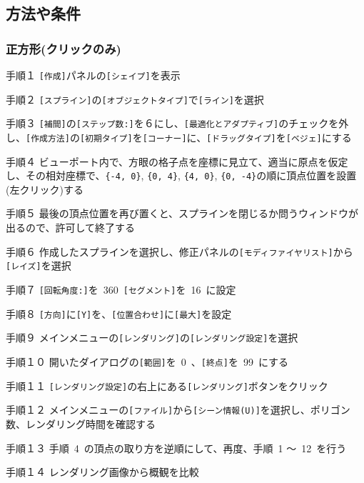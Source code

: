\documentclass[a4j]{jarticle}
\begin{document}
\subsection{方法や条件}
%
\subsubsection{正方形(クリックのみ)}
\begin{description}
\item{手順１} \verb|[作成]|パネルの\verb|[シェイプ]|を表示
\item{手順２} \verb|[スプライン]|の\verb|[オブジェクトタイプ]|で\verb|[ライン]|を選択
\item{手順３} \verb|[補間]|の\verb|[ステップ数:]|を６にし、\verb|[最適化とアダプティブ]|のチェックを外し、\verb|[作成方法]|の\verb|[初期タイプ]|を\verb|[コーナー]|に、\verb|[ドラッグタイプ]|を\verb|[ベジェ]|にする
\item{手順４} ビューポート内で、方眼の格子点を座標に見立て、適当に原点を仮定し、その相対座標で、\verb|{-4, 0}|, \verb|{0, 4}|, \verb|{4, 0}|, \verb|{0, -4}|の順に頂点位置を設置(左クリック)する
\item{手順５} 最後の頂点位置を再び置くと、スプラインを閉じるか問うウィンドウが出るので、許可して終了する
\item{手順６} 作成したスプラインを選択し、修正パネルの\verb|[モディファイヤリスト]|から\verb|[レイズ]|を選択
\item{手順７} \verb|[回転角度:]|を\ 360\ \verb|[セグメント]|を\ 16\ に設定
\item{手順８} \verb|[方向]|に\verb|[Y]|を、\verb|[位置合わせ]|に\verb|[最大]|を設定
\item{手順９} メインメニューの\verb|[レンダリング]|の\verb|[レンダリング設定]|を選択
\item{手順１０} 開いたダイアログの\verb|[範囲]|を\ 0\ 、\verb|[終点]|を\ 99\ にする
\item{手順１１} \verb|[レンダリング設定]|の右上にある\verb|[レンダリング]|ボタンをクリック
\item{手順１２} メインメニューの\verb|[ファイル]|から\verb|[シーン情報(U)]|を選択し、ポリゴン数、レンダリング時間を確認する
\item{手順１３} 手順\ 4\ の頂点の取り方を逆順にして、再度、手順\ 1 ～\ 12\ を行う
\item{手順１４} レンダリング画像から概観を比較
\end{description}
\end{document}

